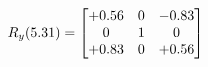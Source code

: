 \documentclass[preview]{standalone}
\begin{document}
\begin{align*}
\special{dvisvgm:raw <g id='unique000'>}R_{y}(5.31) = \begin{bmatrix}+0.56 & 0 & -0.83 \\0 & 1 & 0 \\+0.83 & 0 & +0.56\end{bmatrix}\special{dvisvgm:raw </g>}
\end{align*}
\end{document}
